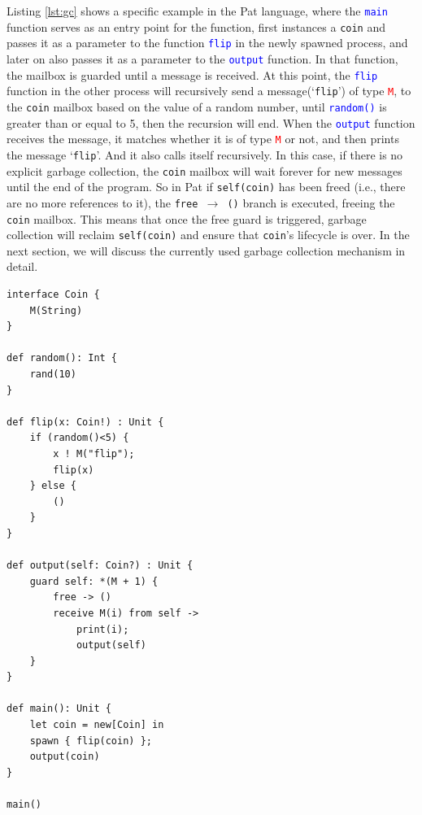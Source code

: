 \documentclass{l4proj}
\begin{document}
Listing \ref{lst:gc} shows a specific example in the Pat language, where the \textcolor{blue}{\texttt{main}} function serves as an entry point for the function, first instances a \texttt{\texttt{coin}} and passes it as a parameter to the function \textcolor{blue}{\texttt{flip}} in the newly spawned process, and later on also passes it as a parameter to the \textcolor{blue}{\texttt{output}} function. In that function, the mailbox is guarded until a message is received. At this point, the \textcolor{blue}{\texttt{flip}} function in the other process will recursively send a message(`\texttt{flip}') of type \textcolor{red}{\texttt{M}}, to the \texttt{coin} mailbox based on the value of a random number, until \textcolor{blue}{\texttt{random()}} is greater than or equal to 5, then the recursion will end. When the \textcolor{blue}{\texttt{output}} function receives the message, it matches whether it is of type \textcolor{red}{\texttt{M}} or not, and then prints the message `\texttt{flip}'. And it also calls itself recursively. In this case, if there is no explicit garbage collection, the \texttt{coin} mailbox will wait forever for new messages until the end of the program. So in Pat if \texttt{self(coin)} has been freed (i.e., there are no more references to it), the \texttt{free $\rightarrow$ ()} branch is executed, freeing the \texttt{coin} mailbox. This means that once the free guard is triggered, garbage collection will reclaim \texttt{self(coin)} and ensure that \texttt{coin}'s lifecycle is over. In the next section, we will discuss the currently used garbage collection mechanism in detail.

\noindent\begin{minipage}{\linewidth}
\lstset{style=patstyle}
\begin{lstlisting}[caption={ Example of the necessity of garbage collection in the Pat}, label={lst:gc}]
interface Coin {
    M(String)
}

def random(): Int {
    rand(10)
}

def flip(x: Coin!) : Unit {
    if (random()<5) {
        x ! M("flip");
        flip(x)
    } else {
        ()
    }
}

def output(self: Coin?) : Unit {
    guard self: *(M + 1) {
        free -> ()
        receive M(i) from self ->
            print(i);
            output(self)
    }
}

def main(): Unit {
    let coin = new[Coin] in 
    spawn { flip(coin) };
    output(coin)
}

main()
\end{lstlisting}
\end{minipage}
\end{document}
